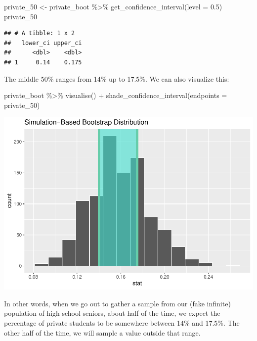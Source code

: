 \documentclass[
]{book}
\newenvironment{Shaded}{\begin{snugshade}}{\end{snugshade}}
\newcommand{\AttributeTok}[1]{\textcolor[rgb]{0.77,0.63,0.00}{#1}}
\newcommand{\FloatTok}[1]{\textcolor[rgb]{0.00,0.00,0.81}{#1}}
\newcommand{\FunctionTok}[1]{\textcolor[rgb]{0.00,0.00,0.00}{#1}}
\newcommand{\NormalTok}[1]{#1}
\newcommand{\OtherTok}[1]{\textcolor[rgb]{0.56,0.35,0.01}{#1}}
\newcommand{\SpecialCharTok}[1]{\textcolor[rgb]{0.00,0.00,0.00}{#1}}
\begin{document}
\begin{Shaded}
\begin{Highlighting}[]
\NormalTok{private\_50 }\OtherTok{\textless{}{-}}\NormalTok{ private\_boot }\SpecialCharTok{\%\textgreater{}\%}
    \FunctionTok{get\_confidence\_interval}\NormalTok{(}\AttributeTok{level =} \FloatTok{0.5}\NormalTok{)}
\NormalTok{private\_50}
\end{Highlighting}
\end{Shaded}

\begin{verbatim}
## # A tibble: 1 x 2
##   lower_ci upper_ci
##      <dbl>    <dbl>
## 1     0.14    0.175
\end{verbatim}

The middle 50\% ranges from 14\% up to 17.5\%. We can also visualize this:

\begin{Shaded}
\begin{Highlighting}[]
\NormalTok{private\_boot }\SpecialCharTok{\%\textgreater{}\%}
    \FunctionTok{visualise}\NormalTok{() }\SpecialCharTok{+}
    \FunctionTok{shade\_confidence\_interval}\NormalTok{(}\AttributeTok{endpoints =}\NormalTok{ private\_50)}
\end{Highlighting}
\end{Shaded}

\includegraphics{intro_stats_files/figure-latex/unnamed-chunk-323-1.pdf}

In other words, when we go out to gather a sample from our (fake infinite) population of high school seniors, about half of the time, we expect the percentage of private students to be somewhere between 14\% and 17.5\%. The other half of the time, we will sample a value outside that range.
\end{document}
